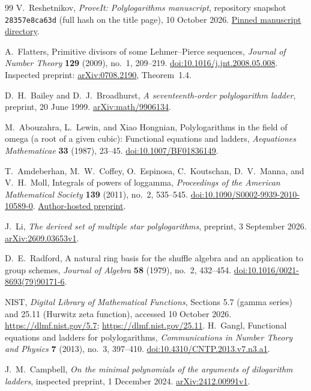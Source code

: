 \begin{thebibliography}{99}
V.~Reshetnikov,
\emph{ProveIt: Polylogarithms manuscript},
repository snapshot
\texttt{28357e8ca63d} (full hash on the title page),
10 October 2026.
\href{https://github.com/VladimirReshetnikov/ProveIt/tree/28357e8ca63dd78327db91d9be239d75e4462879/Analysis/Polylogarithms/docs/manuscript}
{Pinned manuscript directory}.

A.~Flatters,
Primitive divisors of some Lehmer--Pierce sequences,
\emph{Journal of Number Theory} \textbf{129} (2009), no.~1, 209--219.
\href{https://doi.org/10.1016/j.jnt.2008.05.008}
{doi:10.1016/j.jnt.2008.05.008}.
Inspected preprint:
\href{https://arxiv.org/abs/0708.2190}{arXiv:0708.2190}, Theorem~1.4.

D.~H.~Bailey and D.~J.~Broadhurst,
\emph{A seventeenth-order polylogarithm ladder},
preprint, 20 June 1999.
\href{https://arxiv.org/abs/math/9906134}{arXiv:math/9906134}.

M.~Abouzahra, L.~Lewin, and Xiao Hongnian,
Polylogarithms in the field of omega (a root of a given cubic):
Functional equations and ladders,
\emph{Aequationes Mathematicae} \textbf{33} (1987), 23--45.
\href{https://doi.org/10.1007/BF01836149}
{doi:10.1007/BF01836149}.

T.~Amdeberhan, M.~W.~Coffey, O.~Espinosa, C.~Koutschan,
D.~V.~Manna, and V.~H.~Moll,
Integrals of powers of loggamma,
\emph{Proceedings of the American Mathematical Society}
\textbf{139} (2011), no.~2, 535--545.
\href{https://doi.org/10.1090/S0002-9939-2010-10589-0}
{doi:10.1090/S0002-9939-2010-10589-0}.
\href{https://www.math.tulane.edu/~vhm/papers_html/lg-subm.pdf}
{Author-hosted preprint}.

J.~Li,
\emph{The derived set of multiple star polylogarithms},
preprint, 3 September 2026.
\href{https://arxiv.org/abs/2609.03653}{arXiv:2609.03653v1}.

D.~E.~Radford,
A natural ring basis for the shuffle algebra and an application
to group schemes,
\emph{Journal of Algebra} \textbf{58} (1979), no.~2, 432--454.
\href{https://doi.org/10.1016/0021-8693(79)90171-6}
{doi:10.1016/0021-8693(79)90171-6}.

NIST,
\emph{Digital Library of Mathematical Functions},
Sections 5.7 (gamma series) and 25.11 (Hurwitz zeta function),
accessed 10 October 2026.
\url{https://dlmf.nist.gov/5.7};
\url{https://dlmf.nist.gov/25.11}.
H.~Gangl,
Functional equations and ladders for polylogarithms,
\emph{Communications in Number Theory and Physics}
\textbf{7} (2013), no.~3, 397--410.
\href{https://doi.org/10.4310/CNTP.2013.v7.n3.a1}
{doi:10.4310/CNTP.2013.v7.n3.a1}.

J.~M.~Campbell,
\emph{On the minimal polynomials of the arguments of dilogarithm ladders},
inspected preprint, 1 December 2024.
\href{https://arxiv.org/abs/2412.00991}{arXiv:2412.00991v1}.
\end{thebibliography}
